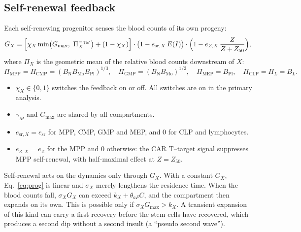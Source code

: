 \documentclass[11pt]{article}
\begin{document}
\subsection{Self-renewal feedback}\label{sec:feedback}
Each self-renewing progenitor senses the blood counts of its own progeny:
\begin{equation}
G_X = \Bigl[\chi_X \min\bigl(G_{\max},\ \Pi_X^{-\gamma_M}\bigr) + (1-\chi_X)\Bigr]\cdot\bigl(1-e_{\mathrm{sr},X}\,E(I)\bigr)\cdot\Bigl(1-e_{Z,X}\,\frac{Z}{Z+Z_{50}}\Bigr), \label{eq:feedback}
\end{equation}
where $\Pi_X$ is the geometric mean of the relative blood counts downstream of $X$:
\begin{equation*}
\Pi_{\mathrm{MPP}}=\Pi_{\mathrm{CMP}}=(B_{\mathrm{N}}B_{\mathrm{Mo}}B_{\mathrm{Pl}})^{1/3},\quad
\Pi_{\mathrm{GMP}}=(B_{\mathrm{N}}B_{\mathrm{Mo}})^{1/2},\quad
\Pi_{\mathrm{MEP}}=B_{\mathrm{Pl}},\quad
\Pi_{\mathrm{CLP}}=\Pi_{L}=B_L.
\end{equation*}
\begin{itemize}
\item $\chi_X\in\{0,1\}$ switches the feedback on or off. All switches are on in the primary analysis.
\item $\gamma_M$ and $G_{\max}$ are shared by all compartments.
\item $e_{\mathrm{sr},X}=e_{\mathrm{sr}}$ for MPP, CMP, GMP and MEP, and 0 for CLP and lymphocytes.
\item $e_{Z,X}=e_Z$ for the MPP and 0 otherwise: the CAR T--target signal suppresses MPP self-renewal, with half-maximal effect at $Z=Z_{50}$.
\end{itemize}

Self-renewal acts on the dynamics only through $G_X$. With a constant $G_X$, Eq.~\ref{eq:prog} is linear and $\sigma_X$ merely lengthens the residence time. When the blood counts fall, $\sigma_X G_X$ can exceed $k_X+\theta_{aP}C$, and the compartment then expands on its own. This is possible only if $\sigma_X G_{\max}>k_X$. A transient expansion of this kind can carry a first recovery before the stem cells have recovered, which produces a second dip without a second insult (a ``pseudo second wave'').
\end{document}
